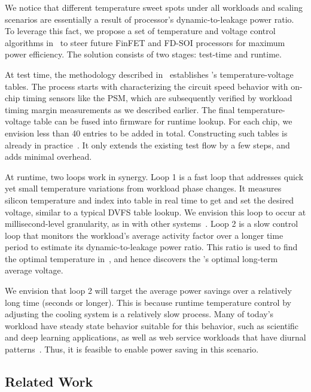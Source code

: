 We notice that different temperature sweet spots under all workloads and scaling scenarios are essentially a result of processor's dynamic-to-leakage power ratio. To leverage this fact, we propose a set of temperature and voltage control algorithms in~ to steer future FinFET and FD-SOI processors for maximum power efficiency. The solution consists of two stages: test-time and runtime.

At test time, the methodology described in~ establishes \tistate's temperature-voltage tables.  The process starts with characterizing the circuit speed behavior with on-chip timing sensors like the PSM, which are subsequently verified by workload timing margin measurements as we described earlier. The final temperature-voltage table can be fused into firmware for runtime lookup. For each chip, we envision less than 40 entries to be added in total. Constructing such tables is already in practice~\cite{sriram2016avfs}. It only extends the existing test flow by a few steps, and adds minimal overhead.

At runtime, two loops work in synergy. Loop 1 is a fast loop that addresses quick yet small temperature variations from workload phase changes. It measures silicon temperature and index into \tistate table in real time to get and set the desired voltage, similar to a typical DVFS table lookup. We envision this loop to occur at millisecond-level granularity, as in with other systems~\cite{lefurgy2011active}. Loop 2 is a slow control loop that monitors the workload's average activity factor over a longer time period to estimate its dynamic-to-leakage power ratio. This ratio is used to find the optimal temperature in~, and hence discovers the \tistate's optimal long-term average voltage.

We envision that loop 2 will target the average power savings over a relatively long time (seconds or longer). This is because runtime temperature control by adjusting the cooling system is a relatively slow process. Many of today's workload have steady state behavior suitable for this behavior, such as scientific and deep learning applications, as well as web service workloads that have diurnal patterns~\cite{lo2014towards}. Thus, it is feasible to enable power saving in this scenario.

\subsection{Related Work}
\label{sec:temperature:related}

